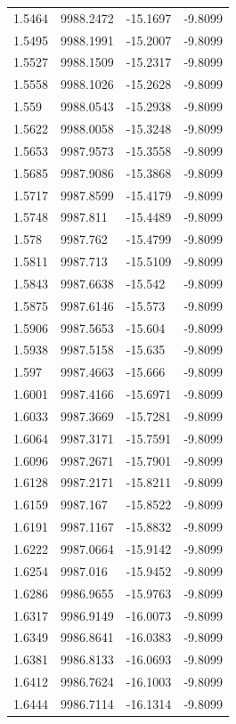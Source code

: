 \begin{table}[H]
\begin{tabular}{llll}
1.5464 & 9988.2472 & -15.1697 & -9.8099 \\
1.5495 & 9988.1991 & -15.2007 & -9.8099 \\
1.5527 & 9988.1509 & -15.2317 & -9.8099 \\
1.5558 & 9988.1026 & -15.2628 & -9.8099 \\
1.559 & 9988.0543 & -15.2938 & -9.8099 \\
1.5622 & 9988.0058 & -15.3248 & -9.8099 \\
1.5653 & 9987.9573 & -15.3558 & -9.8099 \\
1.5685 & 9987.9086 & -15.3868 & -9.8099 \\
1.5717 & 9987.8599 & -15.4179 & -9.8099 \\
1.5748 & 9987.811 & -15.4489 & -9.8099 \\
1.578 & 9987.762 & -15.4799 & -9.8099 \\
1.5811 & 9987.713 & -15.5109 & -9.8099 \\
1.5843 & 9987.6638 & -15.542 & -9.8099 \\
1.5875 & 9987.6146 & -15.573 & -9.8099 \\
1.5906 & 9987.5653 & -15.604 & -9.8099 \\
1.5938 & 9987.5158 & -15.635 & -9.8099 \\
1.597 & 9987.4663 & -15.666 & -9.8099 \\
1.6001 & 9987.4166 & -15.6971 & -9.8099 \\
1.6033 & 9987.3669 & -15.7281 & -9.8099 \\
1.6064 & 9987.3171 & -15.7591 & -9.8099 \\
1.6096 & 9987.2671 & -15.7901 & -9.8099 \\
1.6128 & 9987.2171 & -15.8211 & -9.8099 \\
1.6159 & 9987.167 & -15.8522 & -9.8099 \\
1.6191 & 9987.1167 & -15.8832 & -9.8099 \\
1.6222 & 9987.0664 & -15.9142 & -9.8099 \\
1.6254 & 9987.016 & -15.9452 & -9.8099 \\
1.6286 & 9986.9655 & -15.9763 & -9.8099 \\
1.6317 & 9986.9149 & -16.0073 & -9.8099 \\
1.6349 & 9986.8641 & -16.0383 & -9.8099 \\
1.6381 & 9986.8133 & -16.0693 & -9.8099 \\
1.6412 & 9986.7624 & -16.1003 & -9.8099 \\
1.6444 & 9986.7114 & -16.1314 & -9.8099 \\

\end{tabular}
\end{table}
